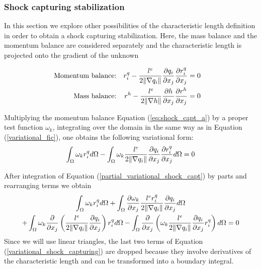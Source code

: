 \subsubsection{Shock capturing stabilization}

In this section we explore other possibilities of the characteristic length definition in order to obtain a shock capturing stabilization. Here, the mass balance and the momentum balance are considered separately and the characteristic length is projected onto the gradient of the unknown

\begin{subequations} \label{eq:shock_capt}
\begin{align}
\text{Momentum balance:} &&
    r_i^q - \frac{l^e}{2\lVert\nabla q_i\rVert}\frac{\partial q_i}{\partial x_j}\frac{\partial r_i^q}{\partial x_j} &= 0 \label{eq:shock_capt_a} && \\ 
\text{Mass balance:} &&
    r^h - \frac{l^e}{2\lVert\nabla h\rVert} \frac{\partial h}{\partial x_j} \frac{\partial r^h}{\partial x_j} &=0 \label{eq:shock_capt_b}
\end{align}
\end{subequations}

Multiplying the momentum balance Equation (\ref{eq:shock_capt_a}) by a proper test function $\omega_k$, integrating over the domain in the same way as in Equation (\ref{variational_fic}),
one obtains the following variational form:
\begin{equation}
    \int_\Omega \omega_k r_i^q d\Omega
     - \int_\Omega \omega_k \frac{l^e}{2\lVert\nabla q_i\rVert}\frac{\partial q_i}{\partial x_j}\frac{\partial r_i^q}{\partial x_j}
     d\Omega = 0
    \label{partial_variational_shock_capt}
\end{equation}

After integration of Equation (\ref{partial_variational_shock_capt}) by parts and rearranging terms we obtain
\begin{multline}
    \int_\Omega \omega_k r_i^q d\Omega 
    + \int_\Omega \frac{\partial\omega_k}{\partial x_j}
        \frac{l^e r_i^q}{2\lVert\nabla q_i\rVert}\frac{\partial q_i}{\partial x_j} d\Omega \\
    + \int_\Omega \omega_k \frac{\partial}{\partial x_j}\left(
         \frac{l^e}{2\lVert\nabla q_i\rVert}\frac{\partial q_i}{\partial x_j}
        \right)r_i^q d\Omega 
    - \int_\Omega \frac{\partial}{\partial x_j}\left(
        \omega_k \frac{l^e}{2\lVert\nabla q_i\rVert}\frac{\partial q_i}{\partial x_j}r_i^q \right) d\Omega
        = 0
        \label{variational_shock_capturing}
\end{multline}
Since we will use linear triangles,
the last two terms of Equation (\ref{variational_shock_capturing}) are dropped because they involve derivatives of the characteristic length and can be transformed into a boundary integral.

